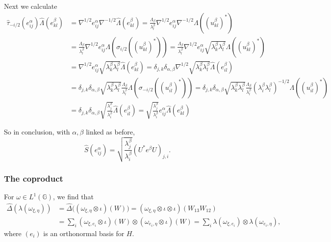 \documentclass[twoside,a4paper,12pt]{article}
\theoremstyle{plain}
\theoremstyle{definition}
\newcommand{\G}{{\mathbb G}}
\begin{document}
Next we calculate
\begin{align*} \hat\tau_{-i/2}(e^\alpha_{ij})\hat\Lambda(e^\beta_{kl})
&= \nabla^{1/2} e^\alpha_{ij} \nabla^{-1/2}\hat\Lambda(e^\beta_{kl})
= \frac{\Lambda_\beta}{\lambda^\beta_l}
\nabla^{1/2} e^\alpha_{ij} \nabla^{-1/2} \Lambda((u^\beta_{kl})^*) \\
&= \frac{\Lambda_\beta}{\lambda^\beta_l}
\nabla^{1/2} e^\alpha_{ij} \Lambda( \sigma_{i/2}((u^\beta_{kl})^*) )
= \frac{\Lambda_\beta}{\lambda^\beta_l}
\nabla^{1/2} e^\alpha_{ij} \sqrt{\lambda^\beta_k\lambda^\beta_l}
\Lambda( (u^\beta_{kl})^* ) \\
&= \nabla^{1/2} e^\alpha_{ij} \sqrt{\lambda^\beta_k\lambda^\beta_l}
\hat\Lambda( e^\beta_{kl} )
= \delta_{j,k} \delta_{\alpha,\beta}
\nabla^{1/2} \sqrt{\lambda^\beta_k\lambda^\beta_l}
\hat\Lambda( e^\beta_{il} ) \\
&= \delta_{j,k} \delta_{\alpha,\beta}
\sqrt{\lambda^\beta_k\lambda^\beta_l}
\frac{\Lambda_\beta}{\lambda^\beta_l}
\Lambda( \sigma_{-i/2}((u^\beta_{il})^*) )
= \delta_{j,k} \delta_{\alpha,\beta}
\sqrt{\lambda^\beta_k\lambda^\beta_l}
\frac{\Lambda_\beta}{\lambda^\beta_l}
(\lambda^\beta_i \lambda^\beta_l)^{-1/2}
\Lambda( (u^\beta_{il})^* ) \\
&= \delta_{j,k} \delta_{\alpha,\beta}
\sqrt{\frac{\lambda^\beta_j}{\lambda^\beta_i}}
\hat\Lambda( e^\beta_{il} )
= \sqrt{\frac{\lambda^\beta_j}{\lambda^\beta_i}}
e^\alpha_{ij} \hat\Lambda(e^\beta_{kl})
\end{align*}

So in conclusion, with $\alpha,\beta$ linked as before,
\[ \hat S(e^\alpha_{ij}) = \sqrt{\frac{\lambda^\beta_j}{\lambda^\beta_i}}
(U^* e^\beta U)_{j,i}. \]


\subsubsection{The coproduct}

For $\omega\in L^1(\G)$, we find that
\begin{align*} \hat\Delta(\lambda(\omega_{\xi,\eta}))
&= \hat\Delta\big( (\omega_{\xi,\eta}\otimes\iota)(W) \big)
= (\omega_{\xi,\eta}\otimes\iota\otimes\iota)(W_{13} W_{12}) \\
&= \sum_i (\omega_{\xi,e_i}\otimes\iota)(W) \otimes
   (\omega_{e_i,\eta}\otimes\iota)(W)
= \sum_i \lambda(\omega_{\xi,e_i}) \otimes
   \lambda(\omega_{e_i,\eta}), \end{align*}
where $(e_i)$ is an orthonormal basis for $H$.
\end{document}
